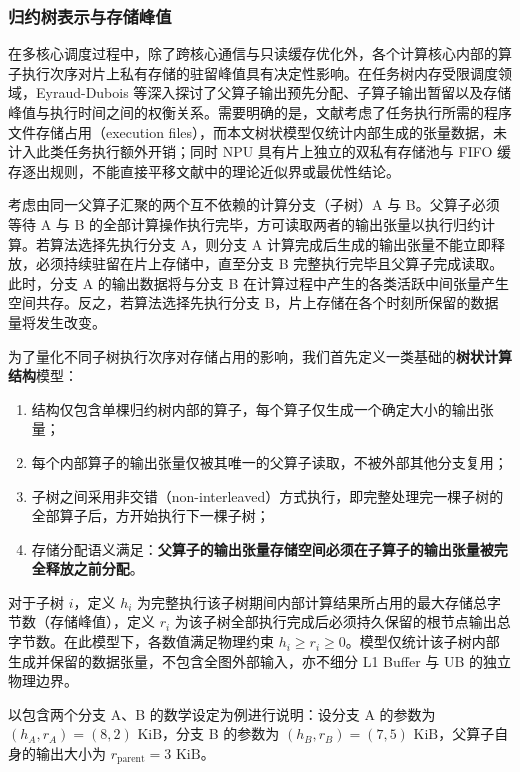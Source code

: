 \documentclass[anonymous,withtoc]{gmcm2026}
\providecommand{\tightlist}{\setlength{\itemsep}{0pt}\setlength{\parskip}{0pt}}
\begin{document}
\subsubsection{归约树表示与存储峰值}

在多核心调度过程中，除了跨核心通信与只读缓存优化外，各个计算核心内部的算子执行次序对片上私有存储的驻留峰值具有决定性影响。在任务树内存受限调度领域，Eyraud-Dubois 等\cite{ref21}深入探讨了父算子输出预先分配、子算子输出暂留以及存储峰值与执行时间之间的权衡关系。需要明确的是，文献\cite{ref21}考虑了任务执行所需的程序文件存储占用（execution files），而本文树状模型仅统计内部生成的张量数据，未计入此类任务执行额外开销；同时 NPU 具有片上独立的双私有存储池与 FIFO 缓存逐出规则，不能直接平移文献\cite{ref21}中的理论近似界或最优性结论。

考虑由同一父算子汇聚的两个互不依赖的计算分支（子树）A 与 B。父算子必须等待 A 与 B 的全部计算操作执行完毕，方可读取两者的输出张量以执行归约计算。若算法选择先执行分支 A，则分支 A 计算完成后生成的输出张量不能立即释放，必须持续驻留在片上存储中，直至分支 B 完整执行完毕且父算子完成读取。此时，分支 A 的输出数据将与分支 B 在计算过程中产生的各类活跃中间张量产生空间共存。反之，若算法选择先执行分支 B，片上存储在各个时刻所保留的数据量将发生改变。

为了量化不同子树执行次序对存储占用的影响，我们首先定义一类基础的\textbf{树状计算结构}模型：

\begin{enumerate}
\def\labelenumi{\arabic{enumi}.}
\tightlist
\item
  结构仅包含单棵归约树内部的算子，每个算子仅生成一个确定大小的输出张量；
\item
  每个内部算子的输出张量仅被其唯一的父算子读取，不被外部其他分支复用；
\item
  子树之间采用非交错（non-interleaved）方式执行，即完整处理完一棵子树的全部算子后，方开始执行下一棵子树；
\item
  存储分配语义满足：\textbf{父算子的输出张量存储空间必须在子算子的输出张量被完全释放之前分配}。
\end{enumerate}

对于子树 \(i\)，定义 \(h_i\) 为完整执行该子树期间内部计算结果所占用的最大存储总字节数（存储峰值），定义 \(r_i\) 为该子树全部执行完成后必须持久保留的根节点输出总字节数。在此模型下，各数值满足物理约束 \(h_i \ge r_i \ge 0\)。模型仅统计该子树内部生成并保留的数据张量，不包含全图外部输入，亦不细分 L1 Buffer 与 UB 的独立物理边界。

以包含两个分支 A、B 的数学设定为例进行说明：设分支 A 的参数为 \((h_A, r_A) = (8, 2)\text{ KiB}\)，分支 B 的参数为 \((h_B, r_B) = (7, 5)\text{ KiB}\)，父算子自身的输出大小为 \(r_{\mathrm{parent}} = 3\text{ KiB}\)。
\end{document}
